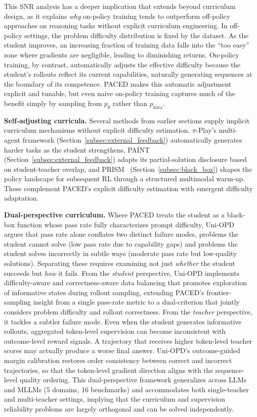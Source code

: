 \documentclass{article} %
\newcommand{\ptheta}{p_\theta}
\newcommand{\pdata}{p_{\mathrm{data}}}
\begin{document}
This SNR analysis has a deeper implication that extends beyond curriculum design, as it explains \emph{why} on-policy training tends to outperform off-policy approaches on reasoning tasks without explicit curriculum engineering. In off-policy settings, the problem difficulty distribution is fixed by the dataset. As the student improves, an increasing fraction of training data falls into the ``too easy'' zone where gradients are negligible, leading to diminishing returns. On-policy training, by contrast, automatically adjusts the effective difficulty because the student's rollouts reflect its current capabilities, naturally generating sequences at the boundary of its competence. PACED makes this automatic adjustment explicit and tunable, but even naive on-policy training captures much of the benefit simply by sampling from $\ptheta$ rather than $\pdata$.

\textbf{Self-adjusting curricula.} Several methods from earlier sections supply implicit curriculum mechanisms without explicit difficulty estimation. $\pi$-Play's multi-agent framework (Section~\ref{subsec:external_feedback}) automatically generates harder tasks as the student strengthens, PAINT~\citep{2604.26573} (Section~\ref{subsec:external_feedback}) adapts its partial-solution disclosure based on student-teacher overlap, and PRISM~\citep{2604.28123} (Section~\ref{subsec:black_box}) shapes the policy landscape for subsequent RL through a structured multimodal warm-up. These complement PACED's explicit difficulty estimation with emergent difficulty adaptation.

\textbf{Dual-perspective curriculum.} Where PACED treats the student as a black-box function whose pass rate fully characterizes prompt difficulty, Uni-OPD~\citep{2605.03677} argues that pass rate alone conflates two distinct failure modes, problems the student cannot solve (low pass rate due to capability gaps) and problems the student solves incorrectly in subtle ways (moderate pass rate but low-quality solutions). Separating these requires examining not just \emph{whether} the student succeeds but \emph{how} it fails. From the \emph{student} perspective, Uni-OPD implements difficulty-aware and correctness-aware data balancing that promotes exploration of informative states during rollout sampling, extending PACED's frontier-sampling insight from a single pass-rate metric to a dual-criterion that jointly considers problem difficulty and rollout correctness. From the \emph{teacher} perspective, it tackles a subtler failure mode. Even when the student generates informative rollouts, aggregated token-level supervision can become inconsistent with outcome-level reward signals. A trajectory that receives higher token-level teacher scores may actually produce a worse final answer. Uni-OPD's outcome-guided margin calibration restores order consistency between correct and incorrect trajectories, so that the token-level gradient direction aligns with the sequence-level quality ordering. This dual-perspective framework generalizes across LLMs and MLLMs (5 domains, 16 benchmarks) and accommodates both single-teacher and multi-teacher settings, implying that the curriculum and supervision reliability problems are largely orthogonal and can be solved independently.
\end{document}
